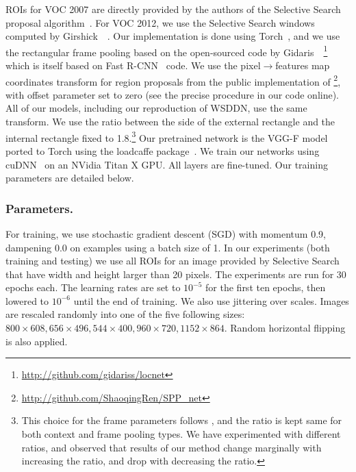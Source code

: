 ROIs for VOC 2007 are directly provided by the authors of the Selective
Search proposal algorithm~\cite{uijlings2013selective}. For VOC 2012, we use the Selective Search windows computed by Girshick~\etal~\cite{Girshick_2015_ICCV}.
Our implementation is done using Torch~\cite{collobert2011torch7}, and we use the
rectangular frame pooling based on the open-sourced code by Gidaris~\etal~\cite{DBLP:journals/corr/GidarisK15a,Gidaris_2015_ICCV}\footnote{\url{http://github.com/gidariss/locnet}} which 
is itself based on Fast R-CNN~\cite{Girshick_2015_ICCV} code.  
We use the pixel$\rightarrow$features map coordinates transform for 
region proposals from the public implementation of \cite{He:2014wg}\footnote{\url{http://github.com/ShaoqingRen/SPP_net}}, 
with offset parameter set to zero (see the precise procedure in our code online\footnotemark[1]).
All of our models, including our reproduction of WSDDN, use the same transform. 
We use the  ratio between the side of the external rectangle and the internal rectangle fixed to 1.8.\footnote{This choice for the frame parameters follows \cite{DBLP:journals/corr/GidarisK15a,Gidaris_2015_ICCV}, and the ratio is kept same for both context and frame pooling types. We have experimented with different ratios, and observed that results of our method change marginally with increasing the ratio, and drop with decreasing  the ratio.}
Our pretrained network is the VGG-F model~\cite{Chatfield14} ported to Torch using the loadcaffe
package~\cite{zagoruyko2015}.
We train our networks using cuDNN~\cite{chetlur2014cudnn} on an NVidia Titan
X GPU. All layers are fine-tuned. Our training parameters are detailed below.

\subsubsection{Parameters.}

For training, we use stochastic gradient descent (SGD) with momentum 0.9, dampening 0.0 on
examples using a batch size of 1. In our experiments (both training and testing) 
we use all ROIs for an image provided by Selective Search~\cite{uijlings2013selective} that have width and height larger than 20 pixels.
The experiments are run for 30 epochs each. The learning rates are set to
$10^{-5}$ for the first ten epochs, then lowered to $10^{-6}$
until the end of training.
We also use jittering over scales. Images are rescaled randomly into one of the
five following sizes: $800\times 608, 656\times 496, 544\times 400, 960\times
720, 1152\times 864$. Random horizontal flipping is also applied. 

